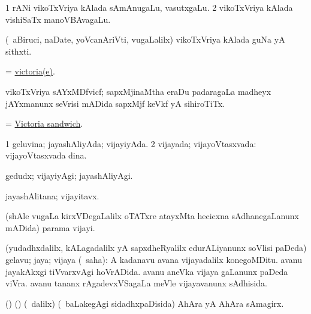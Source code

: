 \bentry
{} 
\gl{\nA}
\expl{(\bava)}
\bmng
\bnum
\num{1} rANi vikoTxVriya kAlada sAmAnugaLu, vasutxgaLu. 
\num{2} vikoTxVriya kAlada vishiSaTx manoVBAvagaLu. 
\enum
\emng
\eentry

\bentry
{} 
\gl{\nA}
\expl{}
\bmng
 (\kanmu\ aBiruci, naDate, yoVcanAriVti, \mo vugaLalilx) vikoTxVriya kAlada guNa yA sithxti. 
\emng
\eentry

\bentry
{}
\gl{\nA}
\expl{}
\bmng
 = \hyperlink{victoria(e)}{victoria(e)}. 
\emng
\eentry

\bentry
{}
\gl{\nA}
\expl{}
\bmng
 vikoTxVriya sAYxMDfvicf; sapxMjinaMtha eraDu padaragaLa madheyx jAYxmanunx seVrisi mADida sapxMjf keVkf yA sihiroTiTx. 
\emng
\eentry

\bentry
{}
\gl{\nA}
\expl{}
\bmng
 = \hyperlink{Victoria sandwich}{Victoria sandwich}. 
\emng
\eentry

\bentry
{} 
\gl{\gu}
\expl{}
\bmng
\bnum
\num{1} geluvina; jayashAliyAda; vijayiyAda. 
\num{2} vijayada; vijayoVtasxvada:  vijayoVtasxvada dina. 
\enum
\emng
\eentry

\bentry
{} 
\gl{\kirxvi}
\expl{}
\bmng
 gedudx; vijayiyAgi; jayashAliyAgi. 
\emng
\eentry

\bentry
{} 
\gl{\nA}
\expl{}
\bmng
 jayashAlitana; vijayitavx. 
\emng
\eentry

\bentry
{} 
\gl{\nA}
\expl{}
\bmng
 (shAle \mo vugaLa kirxVDegaLalilx oTATxre atayxMta hecicxna sAdhanegaLanunx mADida) parama vijayi. 
\emng
\eentry

\bentry
{} 
\gl{\nA}
\bmng
 (yudadhxdalilx, kALagadalilx yA sapxdheRyalilx edurALiyanunx soVlisi paDeda) gelavu; jaya; vijaya (\rUpa\ saha):  A kadanavu avana vijayadalilx konegoMDitu.  avanu jayakAkxgi tiVvarxvAgi hoVrADida.  avanu aneVka vijaya gaLanunx paDeda viVra.  avanu tananx rAgadevxVSagaLa meVle vijayavanunx sAdhisida. 
\emng
\eentry

\bentry
{} 
\gl{\nA}
\expl{}
\bmng
 (\birx) (\aupa) (\sA\ \bava dalilx) (\kanmu\ baLakegAgi sidadhxpaDisida) AhAra yA AhAra sAmagirx. 
\emng
\eentry

